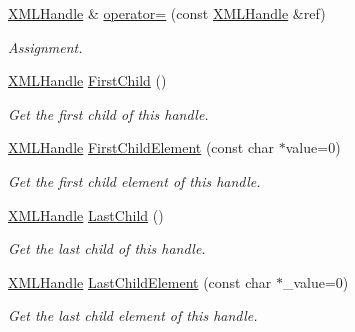 \begin{DoxyCompactItemize}
\hyperlink{classtinyxml2_1_1XMLHandle}{X\+M\+L\+Handle} \& \hyperlink{classtinyxml2_1_1XMLHandle_a75b908322bb4b83be3281b6845252b20}{operator=} (const \hyperlink{classtinyxml2_1_1XMLHandle}{X\+M\+L\+Handle} \&ref)
\begin{DoxyCompactList}\small\item\em Assignment. \end{DoxyCompactList}\item 
\mbox{\label{classtinyxml2_1_1XMLHandle_a536447dc7f54c0cd11e031dad94795ae}} 
\hyperlink{classtinyxml2_1_1XMLHandle}{X\+M\+L\+Handle} \hyperlink{classtinyxml2_1_1XMLHandle_a536447dc7f54c0cd11e031dad94795ae}{First\+Child} ()
\begin{DoxyCompactList}\small\item\em Get the first child of this handle. \end{DoxyCompactList}\item 
\mbox{\label{classtinyxml2_1_1XMLHandle_a99edff695a3cd3feff8a329189140a33}} 
\hyperlink{classtinyxml2_1_1XMLHandle}{X\+M\+L\+Handle} \hyperlink{classtinyxml2_1_1XMLHandle_a99edff695a3cd3feff8a329189140a33}{First\+Child\+Element} (const char $\ast$value=0)
\begin{DoxyCompactList}\small\item\em Get the first child element of this handle. \end{DoxyCompactList}\item 
\mbox{\label{classtinyxml2_1_1XMLHandle_a9d09f04435f0f2f7d0816b0198d0517b}} 
\hyperlink{classtinyxml2_1_1XMLHandle}{X\+M\+L\+Handle} \hyperlink{classtinyxml2_1_1XMLHandle_a9d09f04435f0f2f7d0816b0198d0517b}{Last\+Child} ()
\begin{DoxyCompactList}\small\item\em Get the last child of this handle. \end{DoxyCompactList}\item 
\mbox{\label{classtinyxml2_1_1XMLHandle_a4073e768ebc434b2605343b709a9a554}} 
\hyperlink{classtinyxml2_1_1XMLHandle}{X\+M\+L\+Handle} \hyperlink{classtinyxml2_1_1XMLHandle_a4073e768ebc434b2605343b709a9a554}{Last\+Child\+Element} (const char $\ast$\+\_\+value=0)
\begin{DoxyCompactList}\small\item\em Get the last child element of this handle. \end{DoxyCompactList}\item 

\end{DoxyCompactItemize}
